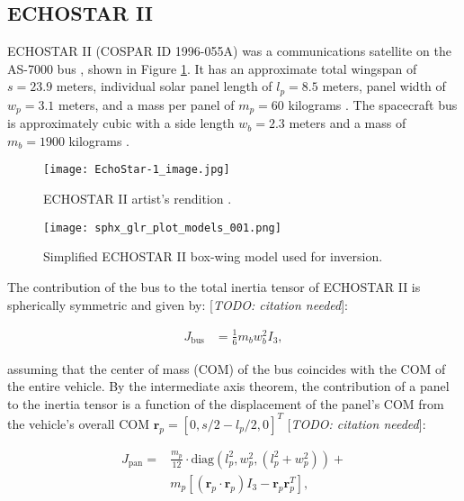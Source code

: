 \documentclass[a4paper,twocolumn]{spaceDebrisC} %
\newcommand{\vctr}[1]{\bm{#1}}
\newcommand{\figbig}[0]{0.5\textwidth}
\begin{document}
\subsection{ECHOSTAR II}

ECHOSTAR II (COSPAR ID 1996-055A) was a communications satellite on the AS-7000 bus \cite{as7000_astronautix}, shown in Figure \ref{fig:echostar1}. It has an approximate total wingspan of $s = 23.9$ meters, individual solar panel length of $l_p=8.5$ meters, panel width of $w_p=3.1$ meters, and a mass per panel of $m_p = 60$ kilograms \cite{earl2015}. The spacecraft bus is approximately cubic with a side length $w_b=2.3$ meters and a mass of $m_b = 1900$ kilograms \cite{earl2015}.

\begin{figure}[ht]
  \centering
  \texttt{[image: EchoStar-1\_image.jpg]}
  \caption{ECHOSTAR II artist's rendition \cite{as7000_astronautix}.}
  \label{fig:echostar1}
\end{figure}

\begin{figure}[ht]
  \centering
  \texttt{[image: sphx\_glr\_plot\_models\_001.png]}
  \caption{Simplified ECHOSTAR II box-wing model used for inversion.}
  \label{fig:echostar1_simple}
\end{figure}

The contribution of the bus to the total inertia tensor of ECHOSTAR II is spherically symmetric and given by: [\textit{TODO: citation needed}]:

\begin{align}
 J_\text{bus} &= \frac{1}{6} m_b w_b^2 I_3,
\end{align}

\noindent
assuming that the center of mass (COM) of the bus coincides with the COM of the entire vehicle. By the intermediate axis theorem, the contribution of a panel to the inertia tensor is a function of the displacement of the panel's COM from the vehicle's overall COM $\vctr{r}_p = [ 0, s/2 - l_p/2, 0]^T$ [\textit{TODO: citation needed}]:

\begin{equation}
  \begin{split}
 J_\text{pan} = &\frac{m_p}{12} \cdot \text{diag}\left(l_p^2, w_p^2, \left(l_p^2 + w_p^2\right) \right) + \\&m_p \left[ \left( \vctr{r}_p \cdot \vctr{r}_p \right) I_3 - \vctr{r}_p \vctr{r}_p^T \right],
  \end{split}
\end{equation}
\end{document}
